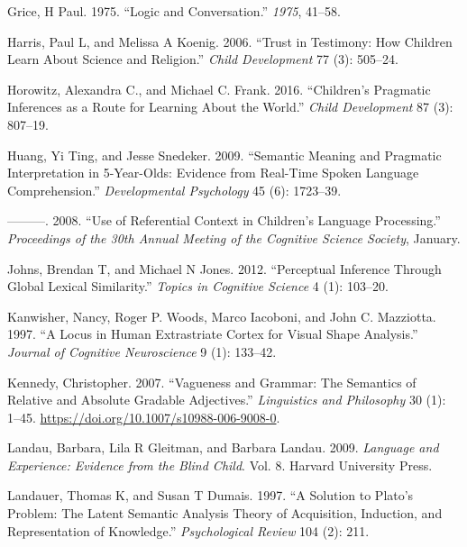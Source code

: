 \documentclass{ucetd}
\newlength{\cslhangindent}
\newenvironment{cslreferences}%
{\setlength{\parindent}{0pt}%
\everypar{\setlength{\hangindent}{\cslhangindent}}\ignorespaces}%
{\par}
\begin{document}
\begin{cslreferences}
\leavevmode\hypertarget{ref-grice1975logic}{}%
Grice, H Paul. 1975. ``Logic and Conversation.'' \emph{1975}, 41--58.

\leavevmode\hypertarget{ref-harris2006}{}%
Harris, Paul L, and Melissa A Koenig. 2006. ``Trust in Testimony: How
Children Learn About Science and Religion.'' \emph{Child Development} 77
(3): 505--24.

\leavevmode\hypertarget{ref-horowitz_childrens_2016}{}%
Horowitz, Alexandra C., and Michael C. Frank. 2016. ``Children's
Pragmatic Inferences as a Route for Learning About the World.''
\emph{Child Development} 87 (3): 807--19.

\leavevmode\hypertarget{ref-huang_semantic_2009}{}%
Huang, Yi Ting, and Jesse Snedeker. 2009. ``Semantic Meaning and
Pragmatic Interpretation in 5-Year-Olds: Evidence from Real-Time Spoken
Language Comprehension.'' \emph{Developmental Psychology} 45 (6):
1723--39.

\leavevmode\hypertarget{ref-huangsnedeker2008}{}%
---------. 2008. ``Use of Referential Context in Children's Language
Processing.'' \emph{Proceedings of the 30th Annual Meeting of the
Cognitive Science Society}, January.

\leavevmode\hypertarget{ref-johns2012}{}%
Johns, Brendan T, and Michael N Jones. 2012. ``Perceptual Inference
Through Global Lexical Similarity.'' \emph{Topics in Cognitive Science}
4 (1): 103--20.

\leavevmode\hypertarget{ref-kanwisher}{}%
Kanwisher, Nancy, Roger P. Woods, Marco Iacoboni, and John C. Mazziotta.
1997. ``A Locus in Human Extrastriate Cortex for Visual Shape
Analysis.'' \emph{Journal of Cognitive Neuroscience} 9 (1): 133--42.

\leavevmode\hypertarget{ref-kennedy_vagueness_2007}{}%
Kennedy, Christopher. 2007. ``Vagueness and Grammar: The Semantics of
Relative and Absolute Gradable Adjectives.'' \emph{Linguistics and
Philosophy} 30 (1): 1--45.
\url{https://doi.org/10.1007/s10988-006-9008-0}.

\leavevmode\hypertarget{ref-landau2009}{}%
Landau, Barbara, Lila R Gleitman, and Barbara Landau. 2009.
\emph{Language and Experience: Evidence from the Blind Child}. Vol. 8.
Harvard University Press.

\leavevmode\hypertarget{ref-landauer1997}{}%
Landauer, Thomas K, and Susan T Dumais. 1997. ``A Solution to Plato's
Problem: The Latent Semantic Analysis Theory of Acquisition, Induction,
and Representation of Knowledge.'' \emph{Psychological Review} 104 (2):
211.


\end{cslreferences}
\end{document}
